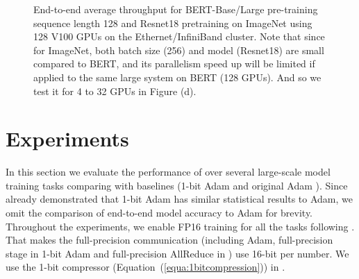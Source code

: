 \begin{figure}[t!]
  \centering
  \caption{End-to-end average throughput for BERT-Base/Large pre-training sequence length 128 and Resnet18 pretraining on ImageNet using 128 V100 GPUs on the Ethernet/InfiniBand cluster. Note that since for ImageNet, both batch size (256) and model (Resnet18) are small compared to BERT, and its parallelism speed up will be limited if applied to the same large system on BERT (128 GPUs). And so we test it for 4 to 32 GPUs in Figure (d).}
  \label{exp:fig:throughput}
\end{figure}

\section{Experiments}
\label{sec:experiment}
In this section we evaluate the performance of {\myalgo} over several large-scale model training tasks comparing with baselines (1-bit Adam \citep{tang20211} and original Adam \citep{kingma2014adam}). Since \citet{tang20211} already demonstrated that 1-bit Adam has similar statistical results to Adam, we omit the comparison of end-to-end model accuracy to Adam for brevity.
Throughout the experiments, we enable FP16 training for all the tasks following \citep{tang20211}. That makes the full-precision communication (including Adam, full-precision stage in 1-bit Adam and full-precision AllReduce in {\myalgo}) use 16-bit per number. We use the 1-bit compressor (Equation~(\ref{equa:1bitcompression})) in {\myalgo}.

